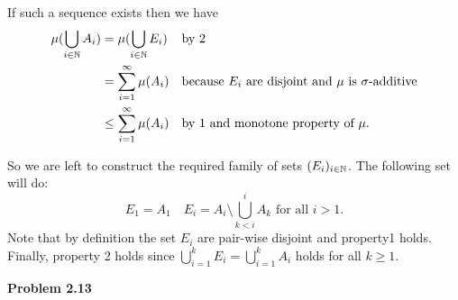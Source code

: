 If such a sequence exists then we have
\begin{align*}
	\mu(\bigcup_{i \in \mathbb N} A_i) &= \mu(\bigcup_{i \in \mathbb N} E_i) &&\text{by 2}\\
	&= \sum_{i = 1}^\infty \mu(A_i) &&\text{because $E_i$ are disjoint and $\mu$ is $\sigma$-additive}\\
	&\le \sum_{i = 1}^\infty \mu(A_i) &&\text{by 1 and monotone property of $\mu$}.
\end{align*}

So we are left to construct the required family of sets $(E_i)_{i \in \mathbb N}$. The following set will do:
\[
	E_1 = A_1 \quad E_i = A_i \setminus \bigcup_{k < i}^i A_k \text{ for all } i > 1.
\]
Note that by definition the set $E_i$ are pair-wise disjoint and property1 holds. Finally, property 2 holds since $\bigcup_{i = 1}^k E_i = \bigcup_{i = 1}^k A_i$ holds for all $k \ge 1$.

\bigskip

\textbf{Problem 2.13}

